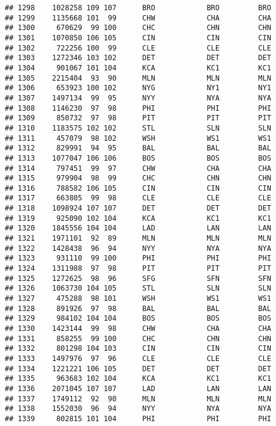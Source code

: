\documentclass[]{article}
\begin{document}
\begin{verbatim}
## 1298    1028258 109 107      BRO            BRO         BRO
## 1299    1135668 101  99      CHW            CHA         CHA
## 1300     670629  99 100      CHC            CHN         CHN
## 1301    1070850 106 105      CIN            CIN         CIN
## 1302     722256 100  99      CLE            CLE         CLE
## 1303    1272346 103 102      DET            DET         DET
## 1304     901067 101 104      KCA            KC1         KC1
## 1305    2215404  93  90      MLN            MLN         MLN
## 1306     653923 100 102      NYG            NY1         NY1
## 1307    1497134  99  95      NYY            NYA         NYA
## 1308    1146230  97  98      PHI            PHI         PHI
## 1309     850732  97  98      PIT            PIT         PIT
## 1310    1183575 102 102      STL            SLN         SLN
## 1311     457079  98 102      WSH            WS1         WS1
## 1312     829991  94  95      BAL            BAL         BAL
## 1313    1077047 106 106      BOS            BOS         BOS
## 1314     797451  99  97      CHW            CHA         CHA
## 1315     979904  98  99      CHC            CHN         CHN
## 1316     788582 106 105      CIN            CIN         CIN
## 1317     663805  99  98      CLE            CLE         CLE
## 1318    1098924 107 107      DET            DET         DET
## 1319     925090 102 104      KCA            KC1         KC1
## 1320    1845556 104 104      LAD            LAN         LAN
## 1321    1971101  92  89      MLN            MLN         MLN
## 1322    1428438  96  94      NYY            NYA         NYA
## 1323     931110  99 100      PHI            PHI         PHI
## 1324    1311988  97  98      PIT            PIT         PIT
## 1325    1272625  98  96      SFG            SFN         SFN
## 1326    1063730 104 105      STL            SLN         SLN
## 1327     475288  98 101      WSH            WS1         WS1
## 1328     891926  97  98      BAL            BAL         BAL
## 1329     984102 104 104      BOS            BOS         BOS
## 1330    1423144  99  98      CHW            CHA         CHA
## 1331     858255  99 100      CHC            CHN         CHN
## 1332     801298 104 103      CIN            CIN         CIN
## 1333    1497976  97  96      CLE            CLE         CLE
## 1334    1221221 106 105      DET            DET         DET
## 1335     963683 102 104      KCA            KC1         KC1
## 1336    2071045 107 107      LAD            LAN         LAN
## 1337    1749112  92  90      MLN            MLN         MLN
## 1338    1552030  96  94      NYY            NYA         NYA
## 1339     802815 101 104      PHI            PHI         PHI

\end{verbatim}
\end{document}
